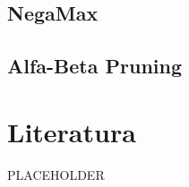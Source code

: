 \documentclass[polish,envcountsect,10pt]{beamer}
\begin{document}
        \subsection{NegaMax}
            \begin{frame}
                
            \end{frame}
        \subsection{Alfa-Beta Pruning}
            \begin{frame}
            \end{frame}
    \section{Literatura}
        \begin{frame}
            \begin{thebibliography}{9}
                PLACEHOLDER
            \end{thebibliography}
        \end{frame}
\end{document}
